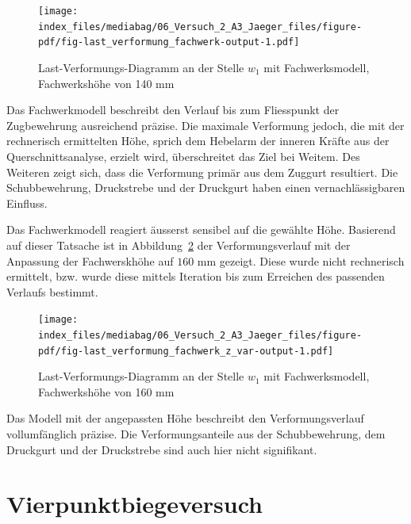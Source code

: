 \documentclass[
  12pt,
  letterpaper,
  egregdoesnotlikesansseriftitles]{scrreprt}
\begin{document}
\begin{figure}[H]

{\centering \texttt{[image: index\_files/mediabag/06\_Versuch\_2\_A3\_Jaeger\_files/figure-pdf/fig-last\_verformung\_fachwerk-output-1.pdf]}

}

\caption{\label{fig-last_verformung_fachwerk}Last-Verformungs-Diagramm
an der Stelle \(w_1\) mit Fachwerksmodell, Fachwerkshöhe von 140 mm}

\end{figure}

Das Fachwerkmodell beschreibt den Verlauf bis zum Fliesspunkt der
Zugbewehrung ausreichend präzise. Die maximale Verformung jedoch, die
mit der rechnerisch ermittelten Höhe, sprich dem Hebelarm der inneren
Kräfte aus der Querschnittsanalyse, erzielt wird, überschreitet das Ziel
bei Weitem. Des Weiteren zeigt sich, dass die Verformung primär aus dem
Zuggurt resultiert. Die Schubbewehrung, Druckstrebe und der Druckgurt
haben einen vernachlässigbaren Einfluss.

Das Fachwerkmodell reagiert äusserst sensibel auf die gewählte Höhe.
Basierend auf dieser Tatsache ist in
Abbildung~\ref{fig-last_verformung_fachwerk_z_var} der
Verformungsverlauf mit der Anpassung der Fachwerskhöhe auf
\(160\text{ mm}\) gezeigt. Diese wurde nicht rechnerisch ermittelt, bzw.
wurde diese mittels Iteration bis zum Erreichen des passenden Verlaufs
bestimmt.

\begin{figure}[H]

{\centering \texttt{[image: index\_files/mediabag/06\_Versuch\_2\_A3\_Jaeger\_files/figure-pdf/fig-last\_verformung\_fachwerk\_z\_var-output-1.pdf]}

}

\caption{\label{fig-last_verformung_fachwerk_z_var}Last-Verformungs-Diagramm
an der Stelle \(w_1\) mit Fachwerksmodell, Fachwerkshöhe von 160 mm}

\end{figure}

Das Modell mit der angepassten Höhe beschreibt den Verformungsverlauf
vollumfänglich präzise. Die Verformungsanteile aus der Schubbewehrung,
dem Druckgurt und der Druckstrebe sind auch hier nicht signifikant.


\hypertarget{sec-vierpunkt}{%
\chapter{Vierpunktbiegeversuch}\label{sec-vierpunkt}}
\end{document}
